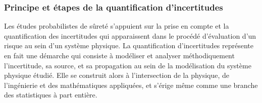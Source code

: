 \subsubsection{Principe et étapes de la quantification d'incertitudes}


Les études probabilistes de sûreté %
s'appuient sur la 
prise en compte et la quantification des incertitudes qui apparaissent dans le procédé d'évaluation d'un risque au sein d'un système physique.
%
La quantification d'incertitudes représente en fait une démarche qui consiste à modéliser et analyser méthodiquement l'incertitude, sa source, et sa propagation au sein de la modélisation du système physique étudié. %
Elle se construit alors à l'intersection de la physique, de l'ingénierie et des mathématiques appliquées, et s'érige même comme une branche des statistiques à part entière.

